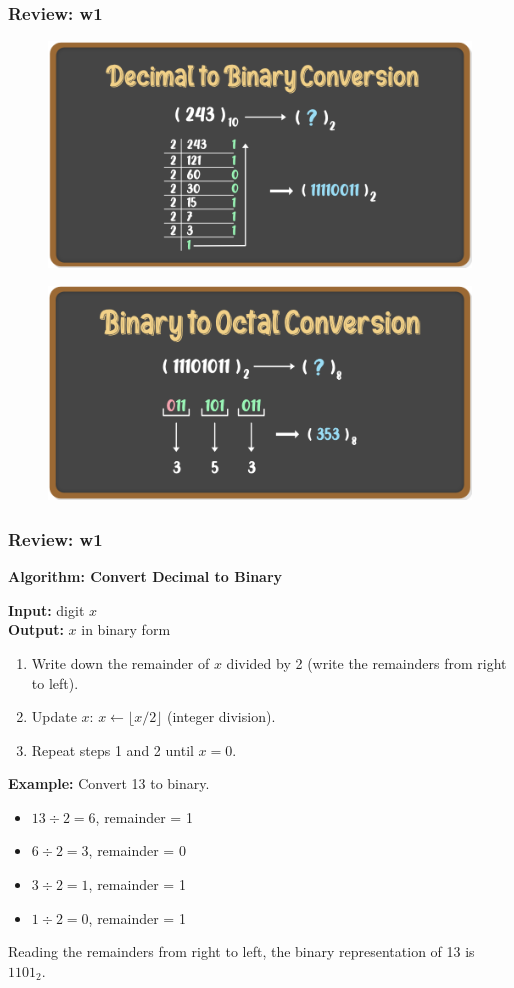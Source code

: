 \documentclass[
	11pt, %
]{beamer}
\begin{document}

\begin{frame}
	\frametitle{Review: w1}

	\begin{figure}
		\includegraphics[width=0.6\linewidth]{dectobin.png}
	\end{figure}

	\begin{figure}
		\includegraphics[width=0.6\linewidth]{bintooct.png}
	\end{figure}




\end{frame}


\begin{frame}
	\frametitle{Review: w1}
\textbf{Algorithm: Convert Decimal to Binary}

\textbf{Input:} digit $x$ \\
\textbf{Output:} $x$ in binary form

\begin{enumerate}
    \item Write down the remainder of $x$ divided by 2 (write the remainders from right to left).
    \item Update $x$: $x \leftarrow \lfloor x / 2 \rfloor$ (integer division).
    \item Repeat steps 1 and 2 until $x = 0$.
\end{enumerate}

\textbf{Example:} Convert 13 to binary.
\begin{itemize}
    \item $13 \div 2 = 6$, remainder = 1
    \item $6 \div 2 = 3$, remainder = 0
    \item $3 \div 2 = 1$, remainder = 1
    \item $1 \div 2 = 0$, remainder = 1
\end{itemize}

Reading the remainders from right to left, the binary representation of 13 is $1101_2$.




\end{frame}
\end{document}
